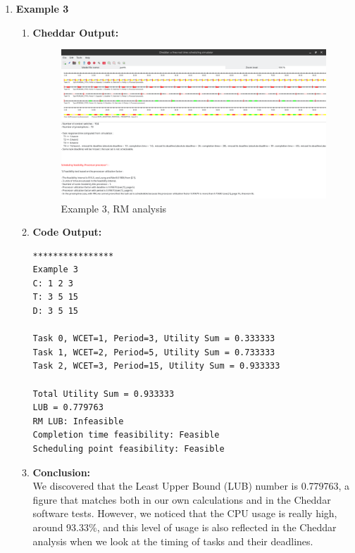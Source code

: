 \documentclass[a4paper,11pt]{article}%
\newenvironment{qanda}{\setlength{\parindent}{0pt}}{\bigskip}
\begin{document}
\begin{qanda}
\begin{enumerate}
\begin{enumerate}
\begin{enumerate}
\begin{enumerate}
					            \end{enumerate}
					      \item \textbf{Example 3}
					            \begin{enumerate}
						            \item \textbf{Cheddar Output:}\\
						                  \begin{figure}[H]
							                  \centering
							                  \includegraphics[scale=0.36]{figures/ex3_rm.png}
							                  \caption{Example 3, RM analysis}
						                  \end{figure}
						            \item \textbf{Code Output:}\\
						                  \begin{verbatim}
****************
Example 3
C: 1 2 3
T: 3 5 15
D: 3 5 15

Task 0, WCET=1, Period=3, Utility Sum = 0.333333
Task 1, WCET=2, Period=5, Utility Sum = 0.733333
Task 2, WCET=3, Period=15, Utility Sum = 0.933333

Total Utility Sum = 0.933333
LUB = 0.779763
RM LUB: Infeasible
Completion time feasibility: Feasible
Scheduling point feasibility: Feasible
										\end{verbatim}
						            \item \textbf{Conclusion:}\\
						                  We discovered that the Least Upper Bound (LUB) number is 0.779763, a figure that matches both in our own calculations and in the Cheddar software tests. However, we noticed that the CPU usage is really high, around 93.33\%, and this level of usage is also reflected in the Cheddar analysis when we look at the timing of tasks and their deadlines.\\


\end{enumerate}
\end{enumerate}
\end{enumerate}
\end{enumerate}
\end{qanda}
\end{document}

